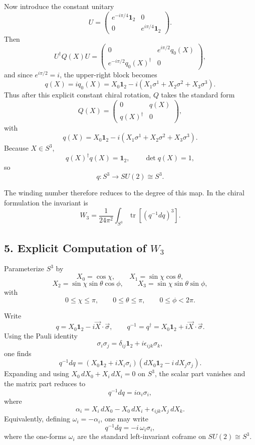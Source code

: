 \documentclass[
]{article}
\begin{document}
Now introduce the constant unitary \[
U =
\begin{pmatrix}
e^{-i\pi/4}\mathbf{1}_2 & 0 \\
0 & e^{i\pi/4}\mathbf{1}_2
\end{pmatrix}.
\] Then \[
U^\dagger Q(X) U=
\begin{pmatrix}
0 & e^{i\pi/2}q_0(X) \\
e^{-i\pi/2}q_0(X)^\dagger & 0
\end{pmatrix},
\] and since \(e^{i\pi/2} = i\), the upper-right block becomes \[
q(X)= i q_0(X) = X_0 \mathbf{1}_2 - i(X_1 \sigma^1 + X_2 \sigma^2 + X_3 \sigma^3).
\] Thus after this explicit constant chiral rotation, \(Q\) takes the
standard form \[
Q(X) =
\begin{pmatrix}
0 & q(X) \\
q(X)^\dagger & 0
\end{pmatrix},
\] with \[
q(X) = X_0 \mathbf{1}_2 - i(X_1 \sigma^1 + X_2 \sigma^2 + X_3 \sigma^3).
\] Because \(X \in S^3\), \[
q(X)^\dagger q(X) = \mathbf{1}_2,
\qquad
\det q(X) = 1,
\] so \[
q : S^3 \to SU(2) \cong S^3.
\]

The winding number therefore reduces to the degree of this map. In the
chiral formulation the invariant is \[
W_3
= \frac{1}{24\pi^2}
\int_{S^3}
\operatorname{tr}\!\left[(q^{-1}dq)^3\right].
\]

\subsection{\texorpdfstring{5. Explicit Computation of
\(W_3\)}{5. Explicit Computation of W\_3}}\label{explicit-computation-of-w_3}

Parameterize \(S^3\) by \[
X_0 = \cos\chi,
\qquad
X_1 = \sin\chi \cos\theta,
\] \[
X_2 = \sin\chi \sin\theta \cos\phi,
\qquad
X_3 = \sin\chi \sin\theta \sin\phi,
\] with \[
0 \le \chi \le \pi, \qquad 0 \le \theta \le \pi, \qquad 0 \le \phi < 2\pi.
\]

Write \[
q = X_0 \mathbf{1}_2 - i \vec{X}\cdot\vec{\sigma},
\qquad
q^{-1} = q^\dagger = X_0 \mathbf{1}_2 + i \vec{X}\cdot\vec{\sigma}.
\] Using the Pauli identity \[
\sigma_i \sigma_j = \delta_{ij}\mathbf{1}_2 + i \epsilon_{ijk}\sigma_k,
\] one finds \[
q^{-1}dq
= (X_0\mathbf{1}_2 + iX_i\sigma_i)(dX_0\mathbf{1}_2 - i\,dX_j\sigma_j).
\] Expanding and using \(X_0\,dX_0 + X_i\,dX_i = 0\) on \(S^3\), the
scalar part vanishes and the matrix part reduces to \[
q^{-1}dq
= i\alpha_i \sigma_i,
\] where \[
\alpha_i = X_i\,dX_0 - X_0\,dX_i + \epsilon_{ijk}X_j\,dX_k.
\] Equivalently, defining \(\omega_i = -\alpha_i\), one may write \[
q^{-1}dq = -i \,\omega_i \sigma_i,
\] where the one-forms \(\omega_i\) are the standard left-invariant
coframe on \(SU(2) \cong S^3\).
\end{document}
